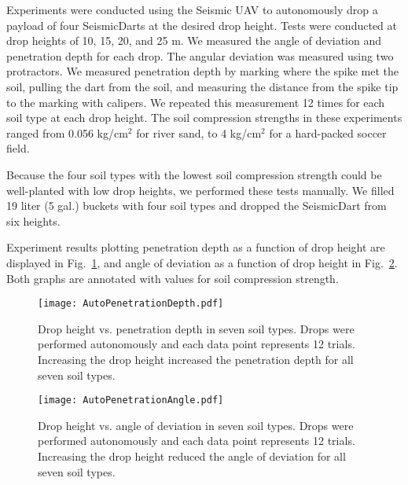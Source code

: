  Experiments were conducted using the Seismic UAV to autonomously drop a payload of four SeismicDarts at the desired drop height. 
 Tests were conducted at drop heights of 10, 15, 20, and 25 m. 
 We measured the angle of deviation and penetration depth for each drop.
 The angular deviation was measured using two protractors.
 We measured penetration depth by marking where the spike met the soil, pulling the dart from the soil, and measuring the distance from the spike tip to the marking with calipers. 
  We repeated this measurement 12 times for each soil type at each drop height.  The soil compression strengths in these experiments ranged from 0.056 kg/cm$^2$ for river sand, to 4 kg/cm$^2$ for a hard-packed soccer field.

Because the four soil types with the lowest soil compression strength could be well-planted with low drop heights, we performed these tests manually. 
We filled 19 liter (5 gal.) buckets with four soil types and dropped the SeismicDart from six heights.

 
Experiment results plotting penetration depth as a function of drop height are displayed in Fig.~\ref{fig:DepthPlotIndoors}, and angle of deviation as a function of drop height in Fig.~\ref{fig:AnglePlotIndoors}.   Both graphs are annotated with values for soil compression strength. 

\begin{figure} \centering
{\texttt{[image: AutoPenetrationDepth.pdf]}}
\caption{Drop height vs. penetration depth in seven soil types. Drops were performed autonomously and each data point represents 12 trials. Increasing the drop height increased the penetration depth for all seven soil types.} 
\label{fig:DepthPlotIndoors}
\end{figure}

\begin{figure} \centering
{\texttt{[image: AutoPenetrationAngle.pdf]}}
\caption{Drop height vs. angle of deviation in seven soil types. Drops were performed autonomously and each data point represents 12 trials. Increasing the drop height reduced the angle of deviation for all seven soil types.} 
\label{fig:AnglePlotIndoors}
\vspace{-1em}
\end{figure}

